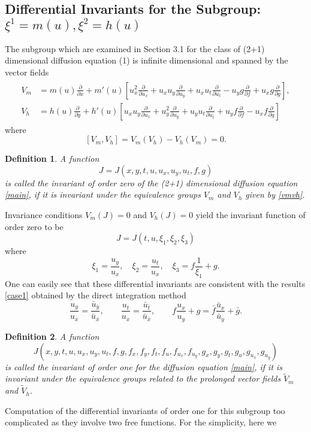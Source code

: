 \documentclass[a4paper]{article}
\newtheorem{definition}{Definition}
\def\bea{\begin{eqnarray}}
\def\eea{\end{eqnarray}}
\def\be{\begin{equation}}
\def\ee{\end{equation}}
\def\bes{\begin{equation*}}
\def\ees{\end{equation*}}
\begin{document}
\subsection {Differential Invariants  for the Subgroup: $ \xi^1=m(u), \xi^2=h(u)$}
The subgroup which are  examined in Section 3.1 for
the class of  (2+1) dimensional diffusion equation
(1) is infinite dimensional and spanned by  the vector fields \bea
\label{vmvh}
\begin{split}
V_m &= m(u) \frac{\partial }{{\partial x }} +m'(u)\left[u_x^2 \frac{\partial}{\partial {u_x}} +u_xu_y \frac{\partial}{\partial {u_y}}+u_xu_t \frac{\partial}{\partial {u_t}}-u_yg  \frac{\partial }{{\partial f }}+ u_xg \frac{\partial }{{\partial g }}\right],\\
V_h &= h(u) \frac{\partial }{{\partial y }} +h'(u)\left[u_xu_y \frac{\partial}{\partial {u_x}} +u_y^2 \frac{\partial}{\partial {u_y}}+u_yu_t \frac{\partial}{\partial {u_t}}+u_yf  \frac{\partial }{{\partial f }}-u_xf \frac{\partial }{{\partial g }}\right]
\end{split}
  \eea
where
  $$[V_m,V_h]=V_m(V_h)-V_h(V_m)=0.$$
  \begin{definition} A function $$J=J(x,y,t,u,u_x,u_y,u_t,f,g)$$ is called the  invariant of order zero of the (2+1) dimensional diffusion equation  \eqref{main}, if it is
    invariant under the equivalence groups $V_m$ and $ V_h$ given by \eqref{vmvh}.
    \end{definition}
Invariance conditions  $V_m(J)=0$ and $V_h(J)=0$ yield the invariant function of order zero to be
  $$J=J(t,u,\xi_1,\xi_2,\xi_3)$$
  where \be
  \label{inv0}
  \xi_1=\frac{u_y}{u_x},\quad \xi_2=\frac{u_t}{u_x},\quad
  \xi_3=f\frac{1}{\xi_1}+g.
  \ee
One can easily see that these differential invariants are consistent with the results \eqref{case1} obtained by the  direct integration method
  $$\frac{u_y}{u_x}=\frac{\bar u_{\bar y}}{\bar u_{\bar x}},\qquad \frac{u_t}{u_x}=\frac{\bar u_{\bar t}}{\bar u_{\bar
  x}}, \qquad f\frac{u_x}{u_y}+g=\bar f\frac{\bar u_x}{\bar u_y}+\bar g.$$
 \begin{definition}
 A function   \bes
J(x,y,t,u,u_x,u_y,u_t,f,g,f_x,f_y,f_t,f_u,f_{u_x},f_{u_y},g_x,g_y,g_t,g_u,g_{u_x},g_{u_y})
\ees
is called the invariant of order one for the diffusion equation \eqref{main}, if it is invariant under the equivalence groups related to the prolonged vector fields $\tilde V_m$ and $\tilde V_h$.
 \end{definition}
Computation of  the differential invariants of order one  for this subgroup too complicated as they involve two free functions. For the simplicity, here we
\end{document}
